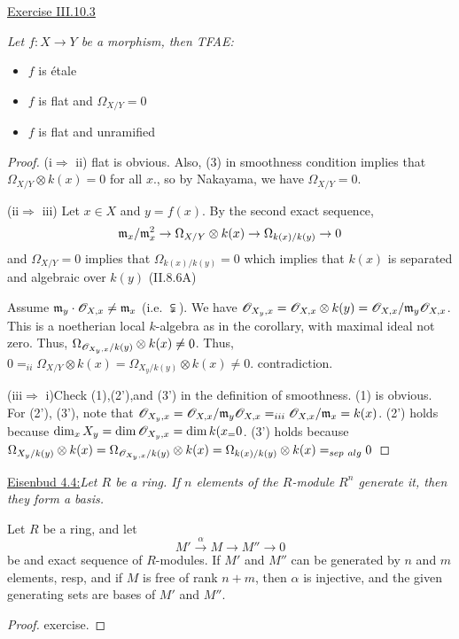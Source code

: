  \underline{Exercise III.10.3} {\it Let $f:X\to Y$ be a morphism,
 then TFAE:
 \begin{itemize}
 \item[(i)] $f$ is \'etale
 \item[(ii)] $f$ is flat and $\Omega_{X/Y}=0$
 \item[(iii)] $f$ is flat and unramified
 \end{itemize}
 }
 \begin{proof}
 (i$\Rightarrow$ ii) flat is obvious.  Also, (3) in smoothness
 condition implies that $\Omega_{X/Y}\otimes k(x)=0$ for all $x$.,
 so by Nakayama, we have $\Omega_{X/Y}=0$.

 (ii$\Rightarrow$ iii) Let $x\in X$ and $y=f(x)$.  By the second
 exact sequence,
 \[
    \mathfrak{m}_x/\mathfrak{m}_x^2 \to \Omega_{X/Y}\otimes k(x) \to
    \Omega_{k(x)/k(y)}\to 0
 \]
 and $\Omega_{X/Y}=0$ implies that $\Omega_{k(x)/k(y)}=0$ which
 implies that $k(x)$ is separated and algebraic over $k(y)$
 (II.8.6A)

 Assume $\mathfrak{m}_y\cdot \mathscr{O}_{X,x}\not=\mathfrak{m}_x$ (i.e. $\subsetneqq$).  We have $\mathscr{O}_{X_y,x}
 = \mathscr{O}_{X,x}\otimes k(y) = \mathscr{O}_{X,x}/\mathfrak{m}_y\mathscr{O}_{X,x}$.  This is a
 noetherian local $k$-algebra as in the corollary, with maximal
 ideal not zero.  Thus, $\Omega_{\mathscr{O}_{X_y,x}/k(y)}\otimes k(x)
 \not=0$.  Thus, $0 =_{ii} \Omega_{X/Y}\otimes k(x) =
 \Omega_{X_y/k(y)}\otimes k(x)\not=0$. contradiction.

 (iii$\Rightarrow$ i)Check (1),(2'),and (3') in the definition of
 smoothness.  (1) is obvious.  For (2'), (3'), note that
 $\mathscr{O}_{X_y,x}=\mathscr{O}_{X,x}/\mathfrak{m}_y\mathscr{O}_{X,x} =_{iii} \mathscr{O}_{X,x}/\mathfrak{m}_x = k(x)$.
 (2') holds because $\dim_x X_y = \dim \mathscr{O}_{X_y,x} = \dim k(x_=0$.
 (3') holds because $\Omega_{X_y/k(y)}\otimes k(x) =
 \Omega_{\mathscr{O}_{X_y,x}/k(y)} \otimes k(x) = \Omega_{k(x)/k(y)}\otimes
 k(x)=_{sep\ alg}0$
 \end{proof}

 \underline{Eisenbud 4.4:}{\it Let $R$ be a ring.  If $n$ elements of
 the $R$-module $R^n$ generate it, then they form a basis.}

 \begin{corollary}
 Let $R$ be a ring, and let
 \[
     M' \xrightarrow{\alpha} M\to M''\to 0
 \]
 be and exact sequence of $R$-modules.  If $M'$ and $M''$ can be
 generated by $n$ and $m$ elements, resp, and if $M$ is free of
 rank $n+m$, then $\alpha$ is injective, and the given generating
 sets are bases of $M'$ and $M''$.
 \end{corollary}
 \begin{proof}
 exercise.
 \end{proof}

